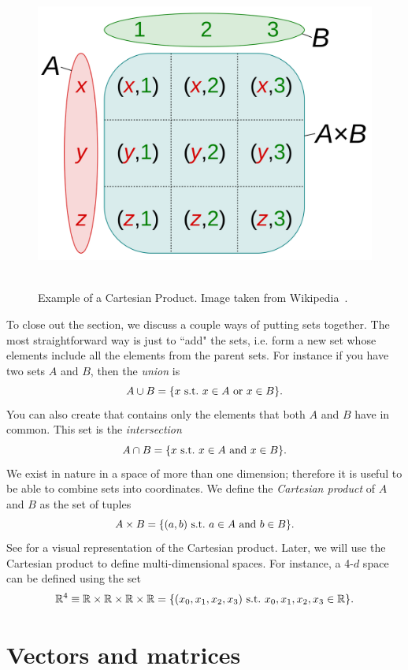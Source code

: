 \begin{figure}
  \centering
  \includegraphics[width=0.45\linewidth]{figs/Cartesian_Product.png}~~~
  \caption{Example of a Cartesian Product. Image taken from 
  Wikipedia~\cite{wiki:cartesian_product}.}
  \label{fig:cartesian_product}
\end{figure} 

To close out the section, we discuss a couple ways of putting sets together.
The most straightforward way is just to ``add" the sets, i.e. form a new set
whose elements include all the elements from the parent sets. For instance if
you have two sets $A$ and $B$, then the {\it union} is
\begin{equation}
A\cup B = \{x~\text{s.t.}~ x\in A~\text{or}~x\in B\}.
\end{equation}
You can also create that contains only the elements that both $A$ and $B$ have
in common. This set is the {\it intersection}
\begin{equation}
A\cap B = \{x~\text{s.t.}~ x\in A~\text{and}~x\in B\}.
\end{equation}
We exist in nature in a space of more than one dimension; therefore it is useful to be
able to combine sets into coordinates. We define the
{\it Cartesian product} of $A$ and $B$ as the set of tuples
\begin{equation}
A\times B=\{(a,b)~\text{s.t.}~ a\in A~\text{and}~b\in B\}.
\end{equation}
See  for a visual representation of the Cartesian
product. Later, we will use the Cartesian product to define multi-dimensional spaces.
For instance, a 4-$d$ space can be defined using the set 
\begin{equation}\label{eq:spacetimeSet}
\mathbb{R}^4\equiv\mathbb{R}\times\mathbb{R}\times\mathbb{R}\times\mathbb{R}=\{(x_0,x_1,x_2,x_3)~\text{s.t.}~
x_0,x_1,x_2,x_3\in\mathbb{R}\}.
\end{equation}


\section{Vectors and matrices}\label{sec:vecmat}

